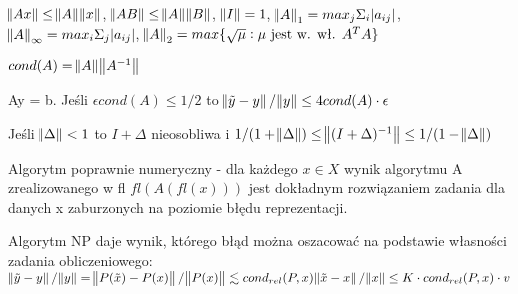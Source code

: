 \entry
$\norm{Ax} \leq \norm{A} \norm{x}$, $\norm{AB} \leq \norm{A} \norm{B}$, $\norm{I} = 1$, $\norm{A}_1 = max_j \Sigma_i |a_{ij}|$, $\norm{A}_\infty = max_i \Sigma_j |a_{ij}|$, $\norm{A}_2 =max\{\sqrt{\mu}: \mu \text{ jest w. wł. }A^TA\}$

\entry 
$cond(A) = \norm{A} \norm{A^{-1}}$

\entry
Ay = b. Jeśli $\epsilon cond(A) \leq 1/2$ to $\norm{\tilde{y}-y}/\norm{y} \leq 4cond(A)\cdot\epsilon$

\entry
Jeśli $\norm{\Delta} < 1$ to $I + \Delta$ nieosobliwa i $1/(1+\norm{\Delta}) \leq \norm{(I+\Delta)^{-1}} \leq 1/(1-\norm{\Delta})$

\entry
Algorytm poprawnie numeryczny - dla każdego $x\in X$ wynik algorytmu A zrealizowanego w fl $fl(A(fl(x)))$ jest dokładnym rozwiązaniem zadania dla danych x zaburzonych na poziomie błędu reprezentacji.

\entry 
Algorytm NP daje wynik, którego błąd można oszacować na podstawie własności zadania obliczeniowego: \\
$\norm{\tilde{y} - y} / \norm{y} = \norm{P(\tilde{x}) - P(x)}/\norm{P(x)} \lesssim cond_{rel}(P, x)\norm{\tilde{x}-x}/\norm{x} \leq K \cdot cond_{rel}(P,x) \cdot v$